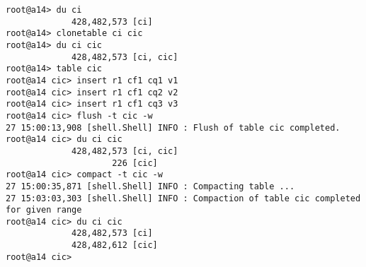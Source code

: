 \small
\begin{verbatim}
root@a14> du ci           
             428,482,573 [ci]
root@a14> clonetable ci cic
root@a14> du ci cic
             428,482,573 [ci, cic]
root@a14> table cic
root@a14 cic> insert r1 cf1 cq1 v1
root@a14 cic> insert r1 cf1 cq2 v2
root@a14 cic> insert r1 cf1 cq3 v3 
root@a14 cic> flush -t cic -w 
27 15:00:13,908 [shell.Shell] INFO : Flush of table cic completed.
root@a14 cic> du ci cic       
             428,482,573 [ci, cic]
                     226 [cic]
root@a14 cic> compact -t cic -w
27 15:00:35,871 [shell.Shell] INFO : Compacting table ...
27 15:03:03,303 [shell.Shell] INFO : Compaction of table cic completed for given range
root@a14 cic> du ci cic        
             428,482,573 [ci]
             428,482,612 [cic]
root@a14 cic> 
\end{verbatim}
\normalsize


